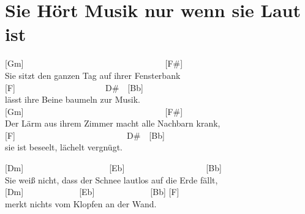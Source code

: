 \documentclass[
  letterpaper,
  a5paper]{memoir}
\begin{document}
\hypertarget{sie-huxf6rt-musik-nur-wenn-sie-laut-ist}{%
\chapter{Sie Hört Musik nur wenn sie Laut
ist}\label{sie-huxf6rt-musik-nur-wenn-sie-laut-ist}}

{[}Gm{]}~~~~~~~~~~~~~~~~~~~~~~~~~~~~~~~~~{[}F\#{]}\\
Sie sitzt den ganzen Tag auf ihrer Fensterbank\\
{[}F{]}~~~~~~~~~~~~~~~~~~~~~D\#~~{[}Bb{]}\\
lässt ihre Beine baumeln zur Musik.\\
{[}Gm{]}~~~~~~~~~~~~~~~~~~~~~~~~~~~~~~~~~{[}F\#{]}\\
Der Lärm aus ihrem Zimmer macht alle Nachbarn krank,\\
{[}F{]}~~~~~~~~~~~~~~~~~~~~~~~~~~D\#~~{[}Bb{]}\\
sie ist beseelt, lächelt vergnügt.

{[}Dm{]}~~~~~~~~~~~~~~~~~~~~{[}Eb{]}~~~~~~~~~~~~~~~~~~~{[}Bb{]}\\
Sie weiß nicht, dass der Schnee lautlos auf die Erde fällt,\\
{[}Dm{]}~~~~~~~~~~~~~{[}Eb{]}~~~~~~~~~~~~~{[}Bb{]} {[}F{]}\\
merkt nichts vom Klopfen an der Wand.
\end{document}
